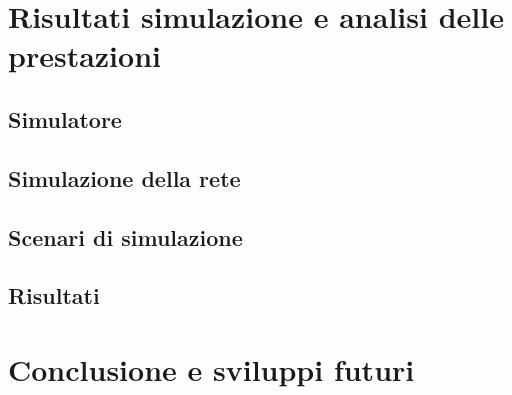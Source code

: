 \documentclass[a4paper]{article}
\begin{document}
		
	\section{Risultati simulazione e analisi delle prestazioni}
		
		\subsection{Simulatore}

		\subsection{Simulazione della rete}
			
		\subsection{Scenari di simulazione}
			
		\subsection{Risultati}
	
	\section{Conclusione e sviluppi futuri}
	
	
	
	
	
\end{document}
